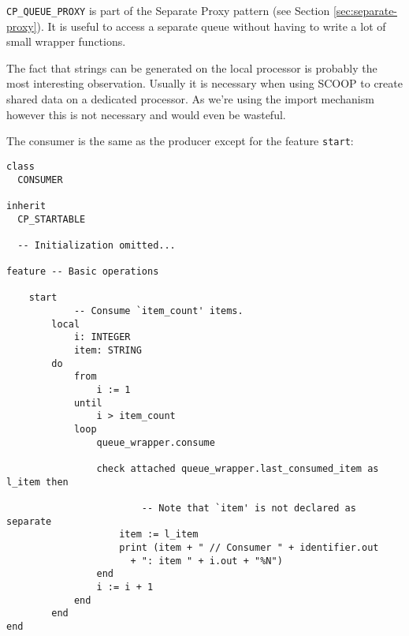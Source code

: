 \lstinline!CP_QUEUE_PROXY! is part of the Separate Proxy pattern  (see Section \ref{sec:separate-proxy}).
It is useful to access a separate queue without having to write a lot of small wrapper functions.

The fact that strings can be generated on the local processor is probably the most interesting observation.
Usually it is necessary when using SCOOP to create shared data on a dedicated processor.
As we're using the import mechanism however this is not necessary and would even be wasteful.



The consumer is the same as the producer except for the feature \lstinline!start!:

\begin{lstlisting}[language=OOSC2Eiffel, captionpos=b, caption={The consumer class.}]
class
  CONSUMER
  
inherit
  CP_STARTABLE

  -- Initialization omitted...

feature -- Basic operations

	start
			-- Consume `item_count' items.
		local
			i: INTEGER
			item: STRING
		do
			from
				i := 1
			until
				i > item_count
			loop
				queue_wrapper.consume

				check attached queue_wrapper.last_consumed_item as l_item then

						-- Note that `item' is not declared as separate
					item := l_item
					print (item + " // Consumer " + identifier.out 
					  + ": item " + i.out + "%N")
				end
				i := i + 1
			end
		end
end
\end{lstlisting}

